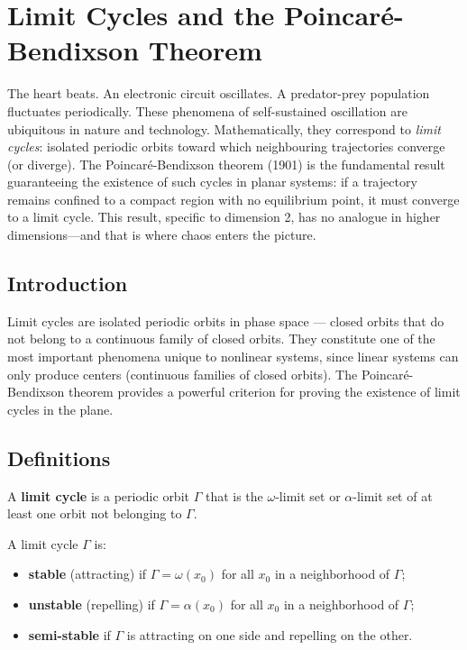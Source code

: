\chapter{Limit Cycles and the Poincar\'e-Bendixson Theorem}
\label{ch:limit_cycles}

The heart beats. An electronic circuit oscillates. A predator-prey population fluctuates periodically. These phenomena of self-sustained oscillation are ubiquitous in nature and technology. Mathematically, they correspond to \emph{limit cycles}: isolated periodic orbits toward which neighbouring trajectories converge (or diverge). The Poincar\'e-Bendixson theorem (1901) is the fundamental result guaranteeing the existence of such cycles in planar systems: if a trajectory remains confined to a compact region with no equilibrium point, it must converge to a limit cycle. This result, specific to dimension 2, has no analogue in higher dimensions---and that is where chaos enters the picture.

\section{Introduction}

Limit cycles are isolated periodic orbits in phase space --- closed orbits
that do not belong to a continuous family of closed orbits. They constitute
one of the most important phenomena unique to nonlinear systems, since linear
systems can only produce centers (continuous families of closed orbits). The
Poincar\'e-Bendixson theorem provides a powerful criterion for proving the
existence of limit cycles in the plane.

\section{Definitions}

\begin{definition}
A \textbf{limit cycle} is a periodic orbit $\Gamma$ that is the
$\omega$-limit set or $\alpha$-limit set of at least one orbit not
belonging to $\Gamma$.
\end{definition}

\begin{definition}
A limit cycle $\Gamma$ is:
\begin{itemize}
    \item \textbf{stable} (attracting) if $\Gamma = \omega(x_0)$ for all
    $x_0$ in a neighborhood of $\Gamma$;
    \item \textbf{unstable} (repelling) if $\Gamma = \alpha(x_0)$ for all
    $x_0$ in a neighborhood of $\Gamma$;
    \item \textbf{semi-stable} if $\Gamma$ is attracting on one side and
    repelling on the other.
\end{itemize}
\end{definition}

